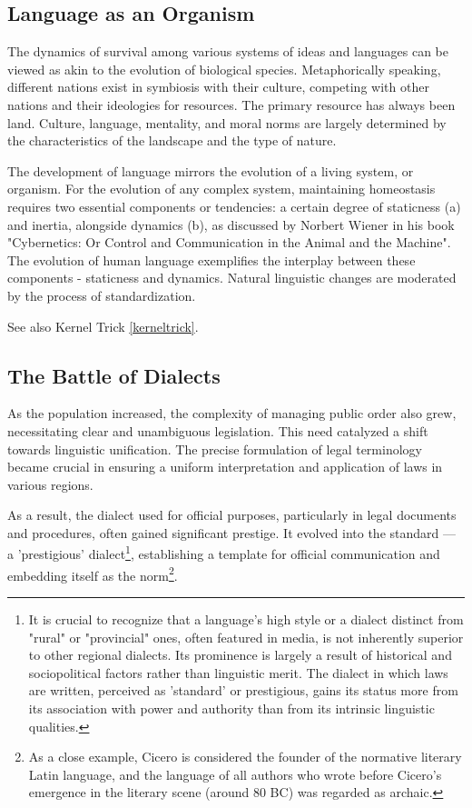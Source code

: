 \documentclass[11pt,a4]{article}
\begin{document}
\subsection{Language as an Organism}
    The dynamics of survival among various systems of ideas and languages can be viewed as akin to the
    evolution of biological species. Metaphorically speaking, different nations exist in symbiosis with
    their culture, competing with other nations and their ideologies for resources.
    The primary resource has always been land. Culture, language, mentality, and moral norms are largely
    determined by the characteristics of the landscape and the type of nature.

    \par
    The development of language mirrors the evolution of a living system, or organism. For the evolution
    of any complex system, maintaining homeostasis requires two essential components or tendencies:
    a certain degree of staticness (a) and inertia, alongside dynamics (b), as discussed by Norbert
    Wiener in his book "Cybernetics: Or Control and Communication in the Animal and the Machine"\cite{Wiener}.
    The evolution of human language exemplifies the interplay between these components - staticness and dynamics.
    Natural linguistic changes are moderated by the process of standardization.

    See also Kernel Trick  \ref{kerneltrick}.

\subsection{The Battle of Dialects}
    As the population increased, the complexity of managing public order also grew,
    necessitating clear and unambiguous legislation. This need catalyzed a shift towards
     linguistic unification. The precise formulation of legal terminology became crucial
     in ensuring a uniform interpretation and application of laws in various regions.
    \par
    As a result, the dialect used for official purposes, particularly in legal documents
    and procedures, often gained significant prestige. It evolved into the
    standard — a 'prestigious' dialect\footnote{It is crucial to recognize that a
    language's high style or a dialect distinct from "rural" or "provincial" ones,
    often featured in media, is not inherently superior to other regional dialects.
    Its prominence is largely a result of historical and sociopolitical factors rather
    than linguistic merit. The dialect in which laws are written, perceived as 'standard'
    or prestigious, gains its status more from its association with power and authority
    than from its intrinsic linguistic qualities.}, establishing a template for official
    communication and embedding itself as the norm\footnote{As a close example,
    Cicero is considered the founder of the normative literary Latin language, and the
    language of all authors who wrote before Cicero's emergence in the literary
    scene (around 80 BC) was regarded as archaic.
    }.
\end{document}
